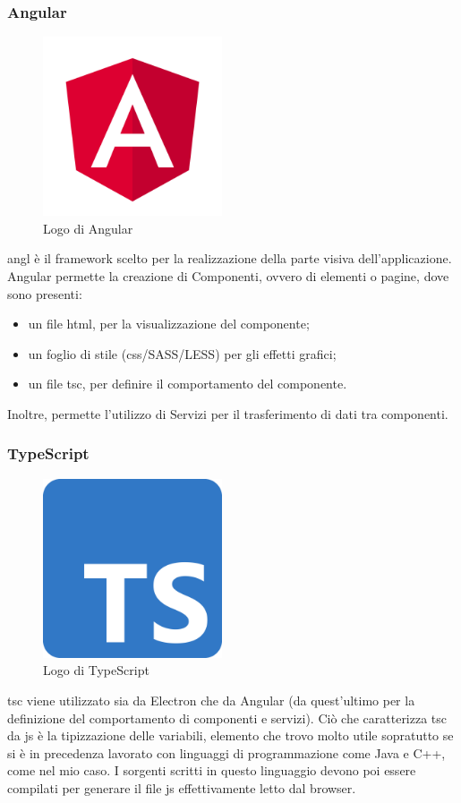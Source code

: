 \subsubsection{Angular}
\label{subsec:angular}
\begin{figure}[h]
    \centering
    \includegraphics[width=150pt]{images/technologies/angular.png}
    \caption{Logo di Angular}
    \label{fig:angular}
\end{figure}
\gls{angl} è il framework scelto per la realizzazione della parte visiva dell'applicazione.
Angular permette la creazione di Componenti, ovvero di elementi o pagine, dove sono presenti:
\begin{itemize}
    \item un file \gls{html}, per la visualizzazione del componente;
    \item un foglio di stile (\gls{css}/SASS/LESS) per gli effetti grafici;
    \item un file \gls{tsc}, per definire il comportamento del componente.
\end{itemize}
Inoltre, permette l'utilizzo di Servizi per il trasferimento di dati tra componenti.
\subsubsection{TypeScript}
\begin{figure}[h]
    \centering
    \includegraphics[width=150pt]{images/technologies/typescript.png}
    \caption{Logo di TypeScript}
    \label{fig:typescript}
\end{figure}
\gls{tsc} viene utilizzato sia da Electron che da Angular (da quest'ultimo per la definizione del comportamento di componenti e servizi).
Ciò che caratterizza \gls{tsc} da \gls{js} è la tipizzazione delle variabili, elemento che trovo molto utile sopratutto se si è in precedenza lavorato con linguaggi di programmazione come Java e C++, come nel mio caso.
I sorgenti scritti in questo linguaggio devono poi essere compilati per generare il file \gls{js} effettivamente letto dal browser.

